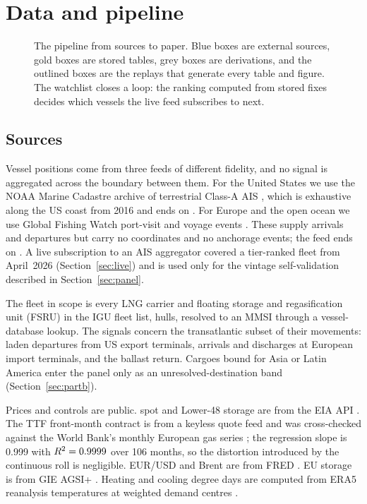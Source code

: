 \section{Data and pipeline}\label{sec:data}

\begin{figure}[tb]
\centering
\resizebox{\textwidth}{!}{}
\caption{The pipeline from sources to paper. Blue boxes are external sources, gold
boxes are stored tables, grey boxes are derivations, and the outlined boxes are the
replays that generate every table and figure. The watchlist closes a loop: the
ranking computed from stored fixes decides which vessels the live feed subscribes
to next.}
\label{fig:pipeline}
\end{figure}

\subsection{Sources}

Vessel positions come from three feeds of different fidelity, and no signal is
aggregated across the boundary between them. For the United States we use the NOAA
Marine Cadastre archive of terrestrial Class-A AIS \citep{noaa_ais}, which is
exhaustive along the US coast from 2016 and ends on \noaaEnds. For Europe and the
open ocean we use Global Fishing Watch port-visit and voyage events \citep{gfw}.
These supply arrivals and departures but carry no coordinates and no anchorage
events; the feed ends on \gfwEnds. A live subscription to an AIS aggregator covered a
tier-ranked fleet from April~2026 (Section~\ref{sec:live}) and is used only for the
vintage self-validation described in Section~\ref{sec:panel}.

The fleet in scope is every LNG carrier and floating storage and regasification
unit (FSRU) in the IGU fleet list, \nFleet{} hulls, resolved to an MMSI through a
vessel-database lookup. The signals concern the transatlantic subset of their
movements: laden departures from US export terminals, arrivals and discharges at
European import terminals, and the ballast return. Cargoes bound for Asia or Latin
America enter the panel only as an unresolved-destination band
(Section~\ref{sec:partb}).

Prices and controls are public. \HH{} spot and Lower-48 storage are from the EIA API
\citep{eia_api}. The TTF front-month contract is from a keyless quote feed and was
cross-checked against the World Bank's monthly European gas series
\citep{worldbank_cmo}; the regression slope is 0.999 with $R^2=0.9999$ over 106
months, so the distortion introduced by the continuous roll is negligible. EUR/USD
and Brent are from FRED \citep{fred}. EU storage is from GIE AGSI+ \citep{agsi}.
Heating and cooling degree days are computed from ERA5 reanalysis temperatures at
weighted demand centres \citep{openmeteo}.

